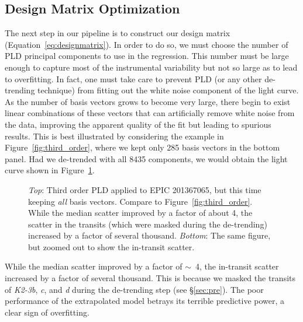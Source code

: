 \documentclass[]{emulateapj}
\begin{document}
\subsection{Design Matrix Optimization}
\label{sec:dmopt}
The next step in our pipeline is to construct our design matrix 
(Equation~\ref{eq:designmatrix}). In order to do so, we must choose the
number of PLD principal components to use in the regression. This number must be
large enough to capture most of the instrumental variability
but not so large as to lead to overfitting. In fact, one must take care
to prevent PLD (or any other de-trending technique) from fitting out the white noise 
component of the light curve. As the number of basis vectors grows to become very large, 
there begin to exist linear combinations of these vectors that can artificially remove 
white noise from the data, improving the apparent quality of the fit but leading to spurious 
results. This is best illustrated by considering the example in Figure~\ref{fig:third_order}, 
where we kept only 285 basis vectors in the bottom panel. Had we de-trended with all 
8435 components, we would obtain the light curve shown in Figure~\ref{fig:overfitting}.
\begin{figure}[h]
  \begin{center}
       \caption{\emph{Top}: Third order PLD applied to EPIC 201367065, but this time keeping 
                \emph{all} basis vectors. Compare to 
                Figure~\ref{fig:third_order}. While the median scatter improved by a factor
                of about 4, the scatter in the transits (which were masked during the de-trending)
                increased by a factor of several thousand. \emph{Bottom}: The same figure, 
                but zoomed out to show the in-transit scatter.}
     \label{fig:overfitting}
  \end{center}
\end{figure}
While the median scatter improved by a factor of $\sim$~4, the in-transit scatter increased
by a factor of several thousand. This is because we masked the transits of \emph{K2-3b},
\emph{c}, and \emph{d} during the de-trending step (see \S\ref{sec:pre}). The poor
performance of the extrapolated model betrays its terrible predictive power, a clear sign
of overfitting.
\end{document}

